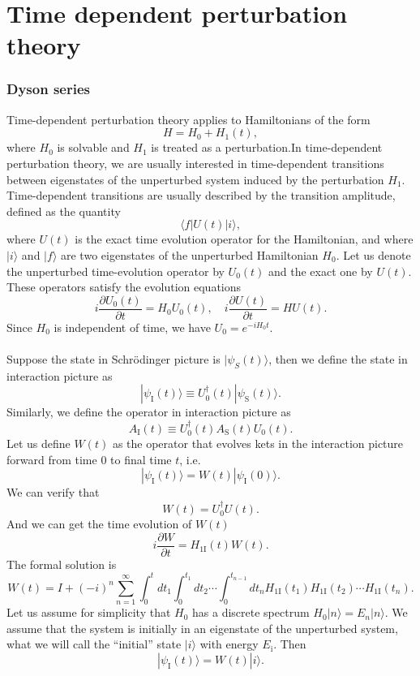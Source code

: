 \section{Time dependent perturbation theory}
\subsubsection{Dyson series}
Time-dependent perturbation theory applies to Hamiltonians of the form
\[H = H_0 + H_1(t),\]
where $H_0$ is solvable and $H_1$ is treated as a perturbation.In time-dependent perturbation theory, we are usually interested in time-dependent transitions between eigenstates of the unperturbed system induced by the perturbation $H_1$.
Time-dependent transitions are usually described by the transition amplitude, defined as the quantity
\[\langle f | U(t) | i \rangle,\]
where $U(t)$ is the exact time evolution operator for the Hamiltonian, and where $|i\rangle$ and $|f\rangle$ are
two eigenstates of the unperturbed Hamiltonian $H_0$. 
Let us denote the unperturbed time-evolution operator by $U_0(t)$ and the exact one by $U(t)$.
These operators satisfy the evolution equations
\[i\frac{\partial U_0(t)}{\partial t} = H_0U_0(t) , \quad i\frac{\partial U(t)}{\partial t} = HU(t).\]
Since $H_0$ is independent of time, we have $U_0 = e^{-iH_0 t}$.\\ \\
Suppose the state in Schr\"{o}dinger picture is $|\psi_S(t)\rangle$, then we define the state in interaction picture as
\[|\psi_{\mathrm{I}}(t)\rangle \equiv U^{\dagger}_0(t) |\psi_{\mathrm{S}}(t)\rangle.\]
Similarly, we define the operator in interaction picture as
\[A_{\mathrm{I}}(t) \equiv U^{\dagger}_0(t) A_{\mathrm{S}}(t) U_0(t).\]
Let us define $W(t)$ as the operator that evolves kets in the interaction picture forward from time $0$ to final time $t$, i.e.
\[ |\psi_{\mathrm{I}}(t)\rangle = W(t) |\psi_{\mathrm{I}}(0)\rangle .\]
We can verify that
\[W(t) = U^{\dagger}_0U(t).\]
And we can get the time evolution of $W(t)$
\[i\frac{\partial W}{\partial t} = H_{1\mathrm{I}}(t)W(t).\]
The formal solution is
\[W(t) = I + (-i)^n \sum_{n=1}^{\infty} \int_{0}^{t}dt_1 \int_{0}^{t_1}dt_2 \cdots \int_{0}^{t_{n-1}} dt_n H_{1\mathrm{I}}(t_1)H_{1\mathrm{I}}(t_2)\cdots H_{1\mathrm{I}}(t_n).\]
Let us assume for simplicity that $H_0$ has a discrete spectrum $H_0|n\rangle = E_n|n\rangle$. 
We assume that the system is initially in an eigenstate of the unperturbed system, what we will call the ``initial'' state $|i\rangle$ with energy $E_{\mathrm{i}}$. Then 
\[|\psi_{\mathrm{I}}(t)\rangle = W(t)|i\rangle.\]
